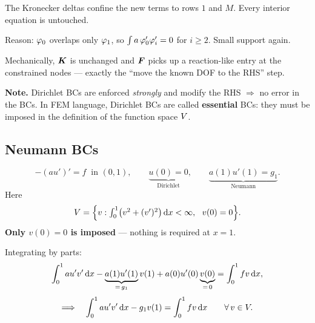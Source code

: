\begin{intuition}
The Kronecker deltas confine the new terms to rows $1$ and $M$. Every interior
equation is untouched.

Reason: $\varphi_{0}$ overlaps only $\varphi_{1}$, so
$\int a\,\varphi_{0}'\varphi_{i}'=0$ for $i\ge2$. Small support again.

Mechanically, $\bm{K}$ is unchanged and $\bm{F}$ picks up a reaction-like entry at
the constrained nodes --- exactly the ``move the known DOF to the RHS'' step.
\end{intuition}

\medskip
\noindent\textbf{Note.} Dirichlet BCs are enforced \emph{strongly} and modify
the RHS $\Rightarrow$ no error in the BCs. In FEM language, Dirichlet BCs are
called \textbf{essential} BCs: they must be imposed in the definition of the
function space $V$.


\subsection*{Neumann BCs}

\begin{equation}\label{eq:neu}
  -(au')'=f \ \text{ in } (0,1),
  \qquad
  \underbrace{u(0)=0}_{\text{Dirichlet}},
  \qquad
  \underbrace{a(1)u'(1)=g_{1}}_{\text{Neumann}} .
\end{equation}
Here
\begin{equation}\label{eq:Vneu}
  V = \Bigl\{ v : \textstyle\int_{0}^{1}\bigl(v^{2}+(v')^{2}\bigr)\,\mathrm{d} x<\infty,\ \ v(0)=0 \Bigr\}.
\end{equation}
\textbf{Only $v(0)=0$ is imposed} --- nothing is required at $x=1$.

Integrating by parts:
\begin{equation}
  \int_{0}^{1} a u'v'\,\mathrm{d} x
  - \underbrace{a(1)u'(1)}_{=\,g_{1}}v(1)
  + a(0)u'(0)\underbrace{v(0)}_{=\,0}
  = \int_{0}^{1} f v\,\mathrm{d} x ,
\end{equation}
\begin{equation}\label{eq:neuvar}
  \Longrightarrow\quad
  \int_{0}^{1} a u'v'\,\mathrm{d} x - g_{1}v(1) = \int_{0}^{1} f v\,\mathrm{d} x
  \qquad \forall\, v\in V .
\end{equation}

